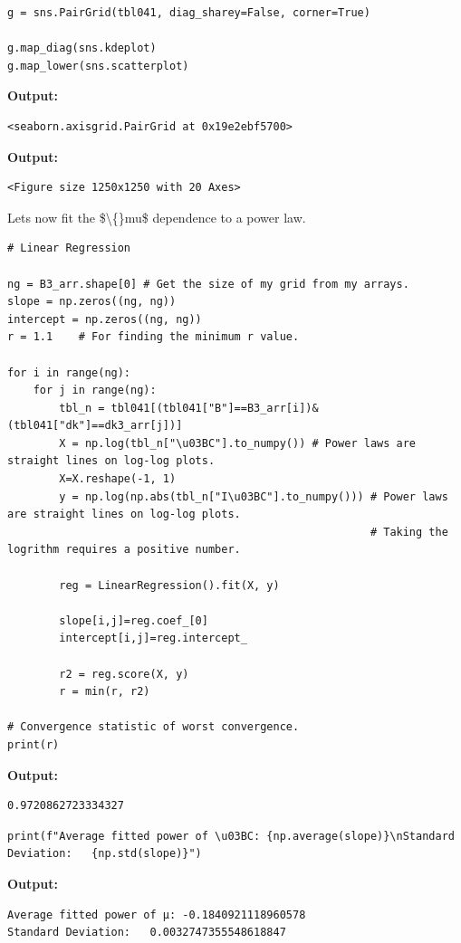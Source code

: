 \documentclass{article}
\begin{document}
\begin{lstlisting}
g = sns.PairGrid(tbl041, diag_sharey=False, corner=True)

g.map_diag(sns.kdeplot)
g.map_lower(sns.scatterplot)\end{lstlisting}

\textbf{Output:}\begin{verbatim}
<seaborn.axisgrid.PairGrid at 0x19e2ebf5700>
\end{verbatim}

\textbf{Output:}\begin{verbatim}
<Figure size 1250x1250 with 20 Axes>
\end{verbatim}

Lets now fit the \$\textbackslash\{\}mu\$ dependence to a power law.

\begin{lstlisting}
# Linear Regression

ng = B3_arr.shape[0] # Get the size of my grid from my arrays.
slope = np.zeros((ng, ng))
intercept = np.zeros((ng, ng))
r = 1.1    # For finding the minimum r value.

for i in range(ng):
    for j in range(ng):
        tbl_n = tbl041[(tbl041["B"]==B3_arr[i])&(tbl041["dk"]==dk3_arr[j])]
        X = np.log(tbl_n["\u03BC"].to_numpy()) # Power laws are straight lines on log-log plots.
        X=X.reshape(-1, 1)
        y = np.log(np.abs(tbl_n["I\u03BC"].to_numpy())) # Power laws are straight lines on log-log plots.
                                                        # Taking the logrithm requires a positive number.

        reg = LinearRegression().fit(X, y)

        slope[i,j]=reg.coef_[0]
        intercept[i,j]=reg.intercept_

        r2 = reg.score(X, y)
        r = min(r, r2)

# Convergence statistic of worst convergence.
print(r) \end{lstlisting}

\textbf{Output:}\begin{verbatim}
0.9720862723334327

\end{verbatim}

\begin{lstlisting}
print(f"Average fitted power of \u03BC: {np.average(slope)}\nStandard Deviation:   {np.std(slope)}")\end{lstlisting}

\textbf{Output:}\begin{verbatim}
Average fitted power of μ: -0.1840921118960578
Standard Deviation:   0.0032747355548618847

\end{verbatim}
\end{document}
